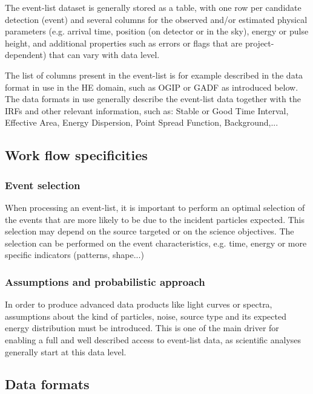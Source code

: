 \documentclass[11pt,a4paper]{ivoa}
\begin{document}
The event-list dataset is generally stored as a table, with one row per candidate detection (event) and several columns for the observed and/or estimated physical parameters (e.g. arrival time, position (on detector or in the sky), energy or pulse height, and additional properties such as errors or flags that are project-dependent) that can vary with data level.

The list of columns present in the event-list is for example described in the data format in use in the HE domain, such as OGIP or GADF as introduced below. The data formats in use generally describe the event-list data together with the IRFs and other relevant information, such as: Stable or Good Time Interval, Effective Area, Energy Dispersion, Point Spread Function, Background,...



\subsection{Work flow specificities}

\subsubsection{Event selection}

When processing an event-list, it is important to perform an optimal {selection of the events} that are more likely to be due to the incident particles expected. This selection may depend on the source targeted or on the science objectives. The selection can be performed on the event characteristics, e.g. time, energy or more specific indicators (patterns, shape...)


\subsubsection{Assumptions and probabilistic approach}

In order to produce advanced data products like light curves or spectra, {assumptions} about the kind of particles, noise, source type and its expected energy distribution must be introduced. This is one of the main driver for enabling a full and well described access to event-list data, as scientific analyses generally start at this data level.


\subsection{Data formats}
\label{sec:data_formats}
\end{document}
